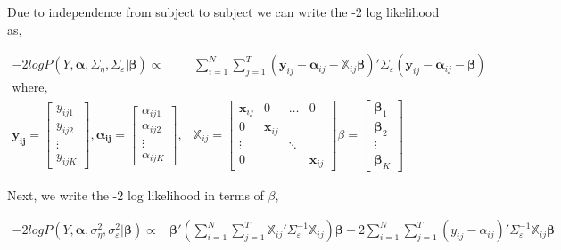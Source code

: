 \documentclass[
]{article}
\begin{document}
Due to independence from subject to subject we can write the -2 log likelihood as,

\begin{equation*}
\begin{aligned}
-2logP(Y, \boldsymbol{\alpha}, \Sigma_\eta, \Sigma_\varepsilon|\boldsymbol{\beta}) \propto & \sum^N_{i=1}\sum^T_{j=1} (\boldsymbol{y}_{ij} - \boldsymbol{\alpha}_{ij} - \boldsymbol{ \mathbb{X}}_{ij}\boldsymbol{\beta})' \Sigma_\varepsilon(\boldsymbol{y}_{ij} - \boldsymbol{\alpha}_{ij} - \boldsymbol{\beta})\\
\text{where,}\\
\boldsymbol{y_{ij}} = \begin{bmatrix}y_{ij1}\\y_{ij2}\\ \vdots \\ y_{ijK}\end{bmatrix}, 
\boldsymbol{\alpha_{ij}} = \begin{bmatrix}\alpha_{ij1}\\\alpha_{ij2}\\ \vdots \\ \alpha_{ijK}\end{bmatrix},  &
\boldsymbol{ \mathbb{X}}_{ij} = \begin{bmatrix}\boldsymbol{x}_{ij} & 0 & \dots & 0 \\ 0 & \boldsymbol{x}_{ij} \\ \vdots & & \ddots \\
0 & & & \boldsymbol{x}_{ij}\end{bmatrix} 
\beta = \begin{bmatrix}\boldsymbol{\beta}_1\\ \boldsymbol{\beta}_2 \\ \vdots \\ \boldsymbol{\beta}_K\end{bmatrix}
\end{aligned}
\end{equation*}

Next, we write the -2 log likelihood in terms of \(\beta\),

\begin{equation*}
\begin{aligned}
-2logP(Y, \boldsymbol{\alpha}, \sigma^2_\eta, \sigma^2_\varepsilon|\boldsymbol{\beta}) 
\propto & \boldsymbol{\beta}'(\sum^N_{i=1}\sum^T_{j=1}\boldsymbol{ \mathbb{X}}_{ij}'\Sigma_\varepsilon^{-1}\boldsymbol{ \mathbb{X}}_{ij})\boldsymbol{\beta} -2\sum^N_{i=1}\sum^T_{j=1}(y_{ij} - \alpha_{ij})'\Sigma_\varepsilon^{-1}\boldsymbol{ \mathbb{X}}_{ij}\boldsymbol{\beta} 
\end{aligned}
\end{equation*}
\end{document}
